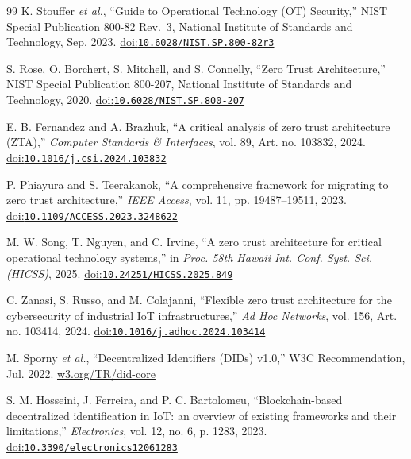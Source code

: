 
\begingroup\small{}
\begin{thebibliography}{99}\small
\setlength{\itemsep}{0pt}
\setlength{\parskip}{0pt}
\small
\setlength{\itemsep}{0pt}
\setlength{\parskip}{0pt}
K. Stouffer \emph{et al.}, ``Guide to Operational Technology (OT) Security,'' NIST Special Publication 800-82 Rev.~3, National Institute of Standards and Technology, Sep. 2023. \href{https://doi.org/10.6028/NIST.SP.800-82r3}{doi:\nolinkurl{10.6028/NIST.SP.800-82r3}}

S. Rose, O. Borchert, S. Mitchell, and S. Connelly, ``Zero Trust Architecture,'' NIST Special Publication 800-207, National Institute of Standards and Technology, 2020. \href{https://doi.org/10.6028/NIST.SP.800-207}{doi:\nolinkurl{10.6028/NIST.SP.800-207}}

E. B. Fernandez and A. Brazhuk, ``A critical analysis of zero trust architecture (ZTA),'' \emph{Computer Standards \& Interfaces}, vol. 89, Art. no. 103832, 2024. \href{https://doi.org/10.1016/j.csi.2024.103832}{doi:\nolinkurl{10.1016/j.csi.2024.103832}}

P. Phiayura and S. Teerakanok, ``A comprehensive framework for migrating to zero trust architecture,'' \emph{IEEE Access}, vol. 11, pp. 19487--19511, 2023. \href{https://doi.org/10.1109/ACCESS.2023.3248622}{doi:\nolinkurl{10.1109/ACCESS.2023.3248622}}

M. W. Song, T. Nguyen, and C. Irvine, ``A zero trust architecture for critical operational technology systems,'' in \emph{Proc. 58th Hawaii Int. Conf. Syst. Sci. (HICSS)}, 2025. \href{https://doi.org/10.24251/HICSS.2025.849}{doi:\nolinkurl{10.24251/HICSS.2025.849}}

C. Zanasi, S. Russo, and M. Colajanni, ``Flexible zero trust architecture for the cybersecurity of industrial IoT infrastructures,'' \emph{Ad Hoc Networks}, vol. 156, Art. no. 103414, 2024. \href{https://doi.org/10.1016/j.adhoc.2024.103414}{doi:\nolinkurl{10.1016/j.adhoc.2024.103414}}

M. Sporny \emph{et al.}, ``Decentralized Identifiers (DIDs) v1.0,'' W3C Recommendation, Jul. 2022. \href{https://www.w3.org/TR/did-core/}{w3.org/TR/did-core}

S. M. Hosseini, J. Ferreira, and P. C. Bartolomeu, ``Blockchain-based decentralized identification in IoT: an overview of existing frameworks and their limitations,'' \emph{Electronics}, vol. 12, no. 6, p. 1283, 2023. \href{https://doi.org/10.3390/electronics12061283}{doi:\nolinkurl{10.3390/electronics12061283}}


\end{thebibliography}
